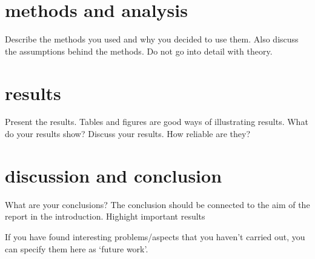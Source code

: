 \documentclass{article}
\begin{document}
\section{methods and analysis}

Describe the methods you used and why you decided to use them. 
Also discuss the assumptions behind the methods. Do not go into detail with theory.

\section{results}

Present the results.
Tables and figures are good ways of illustrating results.
What do your results show?
Discuss your results. How reliable are they?

\section{discussion and conclusion}

What are your conclusions? The conclusion should be connected to the aim of the report in the introduction.
	Highight important results
	
If you have found interesting problems/aspects that you haven’t carried out, you can specify them here as ‘future work’.
\end{document}
